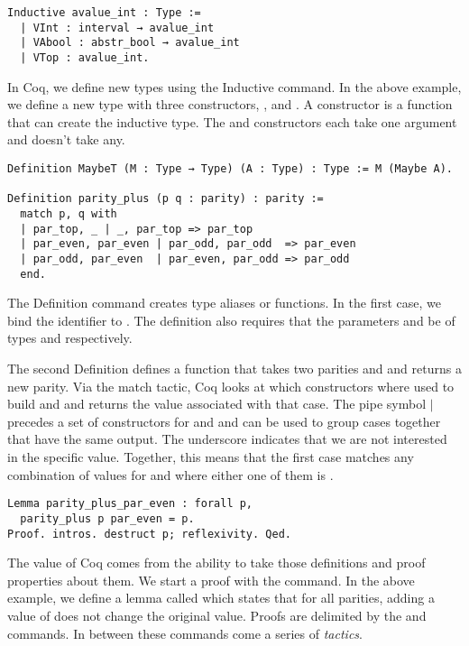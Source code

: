 \begin{verbatim}
Inductive avalue_int : Type := 
  | VInt : interval → avalue_int
  | VAbool : abstr_bool → avalue_int
  | VTop : avalue_int.
\end{verbatim}
In Coq, we define new types using the Inductive command. In the above example,
we define a new type  with three constructors, ,
 and . A constructor is a function that can create the
inductive type. The  and  constructors each take one
argument and  doesn't take any.

\begin{verbatim}
Definition MaybeT (M : Type → Type) (A : Type) : Type := M (Maybe A).

Definition parity_plus (p q : parity) : parity :=
  match p, q with 
  | par_top, _ | _, par_top => par_top
  | par_even, par_even | par_odd, par_odd  => par_even
  | par_odd, par_even  | par_even, par_odd => par_odd
  end.
\end{verbatim}

The Definition command creates type aliases or functions. In the first case, we
bind the identifier  to . The definition
also requires that the parameters  and  be of types  and  respectively.

The second Definition defines a function  that takes 
two parities  and  and returns a new parity. Via the match
tactic, Coq looks at which constructors where used to build  and
 and returns the value associated with that case. The pipe symbol $|$
precedes a set of constructors for  and  and can be used to
group cases together that have the same output. The underscore indicates that
we are not interested in the specific value. Together, this means that the
first case  matches any combination
of values for  and  where either one of them is .

\begin{verbatim}
Lemma parity_plus_par_even : forall p,
  parity_plus p par_even = p.
Proof. intros. destruct p; reflexivity. Qed.
\end{verbatim}

The value of Coq comes from the ability to take those definitions and proof
properties about them. We start a proof with the  command. In the
above example, we define a lemma called  which
states that for all parities, adding a value of  does not change
the original value. Proofs are delimited by the  and  
commands. In between these commands come a series of \emph{tactics}. 

